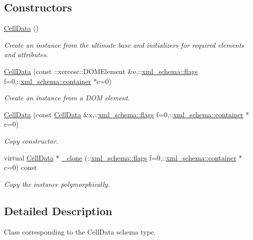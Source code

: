 \subsection*{Constructors}
\begin{DoxyCompactItemize}
\item 
\hyperlink{classCellData_a0d89ba23195659a1fcdc714fa27697a5}{Cell\-Data} ()
\begin{DoxyCompactList}\small\item\em Create an instance from the ultimate base and initializers for required elements and attributes. \end{DoxyCompactList}\item 
\hyperlink{classCellData_ac98b30101e2448016bfa96b9fa6ee18a}{Cell\-Data} (const \-::xercesc\-::\-D\-O\-M\-Element \&e,\-::\hyperlink{namespacexml__schema_a8d981c127a1f5106d04ad5853e707361}{xml\-\_\-schema\-::flags} f=0,\-::\hyperlink{namespacexml__schema_a395f5179c5fc4643909d66e9ff28d8ca}{xml\-\_\-schema\-::container} $\ast$c=0)
\begin{DoxyCompactList}\small\item\em Create an instance from a D\-O\-M element. \end{DoxyCompactList}\item 
\hyperlink{classCellData_ae93656ff9893f518c8f1cfdc611c8045}{Cell\-Data} (const \hyperlink{classCellData}{Cell\-Data} \&x,\-::\hyperlink{namespacexml__schema_a8d981c127a1f5106d04ad5853e707361}{xml\-\_\-schema\-::flags} f=0,\-::\hyperlink{namespacexml__schema_a395f5179c5fc4643909d66e9ff28d8ca}{xml\-\_\-schema\-::container} $\ast$c=0)
\begin{DoxyCompactList}\small\item\em Copy constructor. \end{DoxyCompactList}\item 
virtual \hyperlink{classCellData}{Cell\-Data} $\ast$ \hyperlink{classCellData_aa17c3a153b3a7692dca562878f3fe3ad}{\-\_\-clone} (\-::\hyperlink{namespacexml__schema_a8d981c127a1f5106d04ad5853e707361}{xml\-\_\-schema\-::flags} f=0,\-::\hyperlink{namespacexml__schema_a395f5179c5fc4643909d66e9ff28d8ca}{xml\-\_\-schema\-::container} $\ast$c=0) const 
\begin{DoxyCompactList}\small\item\em Copy the instance polymorphically. \end{DoxyCompactList}\end{DoxyCompactItemize}


\subsection{Detailed Description}
Class corresponding to the Cell\-Data schema type. 

